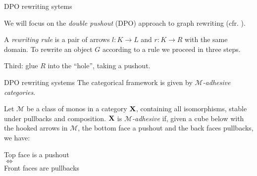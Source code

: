 \documentclass[usenames,dvipsnames]{beamer}
\def\X{\textbf {\textup{X}}}
\begin{document}
\begin{frame}{DPO rewriting sytems}
\begin{overprint}
We will focus on the \emph{double pushout} (DPO) approach  to  graph rewriting (cfr. \cite{ehrig2006fundamentals}). 
\smallskip 
		
		A \emph{rewriting rule} is a pair  of arrows $l:K\to L$ and $r:K\to R$ with the same domain. To rewrite an object $G$ according to a rule we proceed in three steps.
		
		Third: glue $R$ into the ``hole'',  taking a pushout.\vspace{-0.075cm}
		\begin{center}\hspace{0.08cm}
		\end{center}		
	\end{overprint}  	
\end{frame}

\begin{frame}{DPO rewriting systems}\justifying
The categorical framework is given by \emph{$\mathcal{M}$-adhesive categories}. \pause 
\begin{definition}
	Let $\mathcal{M}$ be a class of monos in a category $\X$, containing all isomorphisms, stable under pullbacks and composition. $\X$ is \emph{$\mathcal{M}$-adhesive} if, given a cube below with the hooked arrows in $\mathcal{M}$, the bottom face a pushout and the back faces pullbacks, we have:
	
	\parbox{5cm}{\centering {}} \quad 	\parbox{4cm}{\centering
	Top face is a pushout \\ $\iff$ \\ Front faces are pullbacks}
	
\end{definition}
\end{frame}
\end{document}
